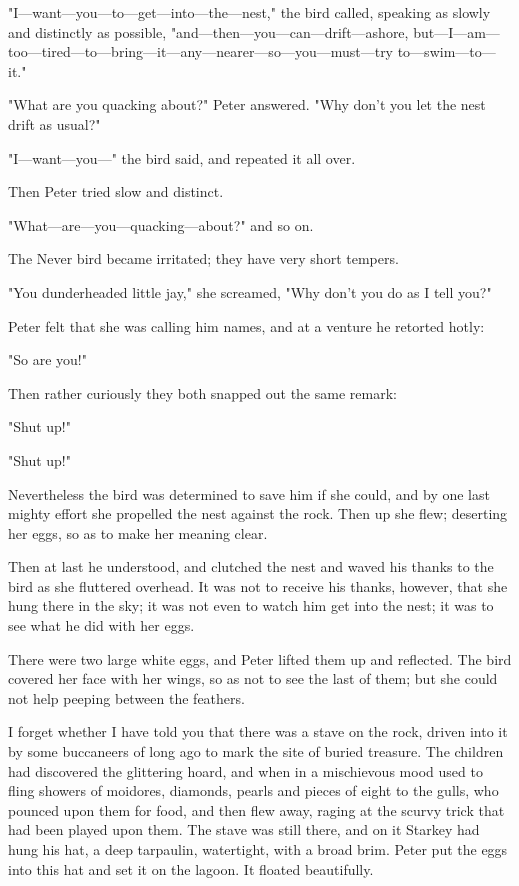 "I—want—you—to—get—into—the—nest,"
the bird called, speaking as slowly and distinctly as possible, "and—then—you—can—drift—ashore,
but—I—am—too—tired—to—bring—it—any—nearer—so—you—must—try
to—swim—to—it."


"What are you quacking about?" Peter answered. "Why don't you let the nest
drift as usual?"


"I—want—you—" the bird said, and repeated it all over.


Then Peter tried slow and distinct.


"What—are—you—quacking—about?" and so on.


The Never bird became irritated; they have very short tempers.


"You dunderheaded little jay," she screamed, "Why don't you do as I tell
you?"


Peter felt that she was calling him names, and at a venture he retorted
hotly:


"So are you!"


Then rather curiously they both snapped out the same remark:


"Shut up!"


"Shut up!"


Nevertheless the bird was determined to save him if she could, and by one
last mighty effort she propelled the nest against the rock. Then up she
flew; deserting her eggs, so as to make her meaning clear.


Then at last he understood, and clutched the nest and waved his thanks to
the bird as she fluttered overhead. It was not to receive his thanks,
however, that she hung there in the sky; it was not even to watch him get
into the nest; it was to see what he did with her eggs.


There were two large white eggs, and Peter lifted them up and reflected.
The bird covered her face with her wings, so as not to see the last of
them; but she could not help peeping between the feathers.


I forget whether I have told you that there was a stave on the rock,
driven into it by some buccaneers of long ago to mark the site of buried
treasure. The children had discovered the glittering hoard, and when in a
mischievous mood used to fling showers of moidores, diamonds, pearls and
pieces of eight to the gulls, who pounced upon them for food, and then
flew away, raging at the scurvy trick that had been played upon them. The
stave was still there, and on it Starkey had hung his hat, a deep
tarpaulin, watertight, with a broad brim. Peter put the eggs into this hat
and set it on the lagoon. It floated beautifully.


